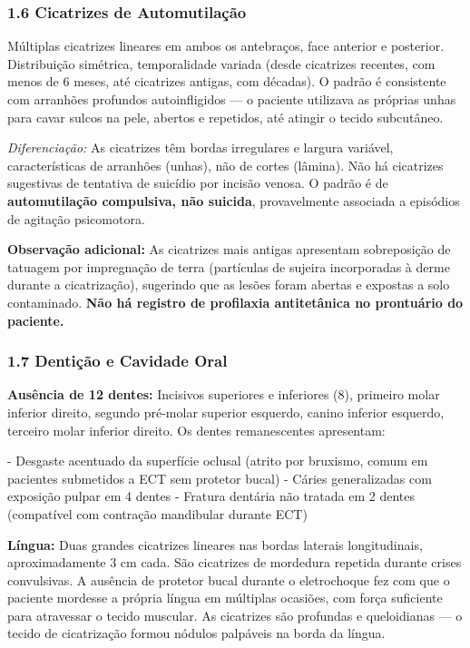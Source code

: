 \subsubsection*{1.6 Cicatrizes de Automutilação}

\noindent Múltiplas cicatrizes lineares em ambos os antebraços, face anterior e posterior. Distribuição simétrica, temporalidade variada (desde cicatrizes recentes, com menos de 6 meses, até cicatrizes antigas, com décadas). O padrão é consistente com arranhões profundos autoinfligidos --- o paciente utilizava as próprias unhas para cavar sulcos na pele, abertos e repetidos, até atingir o tecido subcutâneo.

\noindent \textit{Diferenciação:} As cicatrizes têm bordas irregulares e largura variável, características de arranhões (unhas), não de cortes (lâmina). Não há cicatrizes sugestivas de tentativa de suicídio por incisão venosa. O padrão é de \textbf{automutilação compulsiva, não suicida}, provavelmente associada a episódios de agitação psicomotora.

\noindent \textbf{Observação adicional:} As cicatrizes mais antigas apresentam sobreposição de tatuagem por impregnação de terra (partículas de sujeira incorporadas à derme durante a cicatrização), sugerindo que as lesões foram abertas e expostas a solo contaminado. \textbf{Não há registro de profilaxia antitetânica no prontuário do paciente.}

\subsubsection*{1.7 Dentição e Cavidade Oral}

\noindent \textbf{Ausência de 12 dentes:} Incisivos superiores e inferiores (8), primeiro molar inferior direito, segundo pré-molar superior esquerdo, canino inferior esquerdo, terceiro molar inferior direito. Os dentes remanescentes apresentam:

\noindent - Desgaste acentuado da superfície oclusal (atrito por bruxismo, comum em pacientes submetidos a ECT sem protetor bucal)
- Cáries generalizadas com exposição pulpar em 4 dentes
- Fratura dentária não tratada em 2 dentes (compatível com contração mandibular durante ECT)

\noindent \textbf{Língua:} Duas grandes cicatrizes lineares nas bordas laterais longitudinais, aproximadamente 3 cm cada. São cicatrizes de mordedura repetida durante crises convulsivas. A ausência de protetor bucal durante o eletrochoque fez com que o paciente mordesse a própria língua em múltiplas ocasiões, com força suficiente para atravessar o tecido muscular. As cicatrizes são profundas e queloidianas --- o tecido de cicatrização formou nódulos palpáveis na borda da língua.

